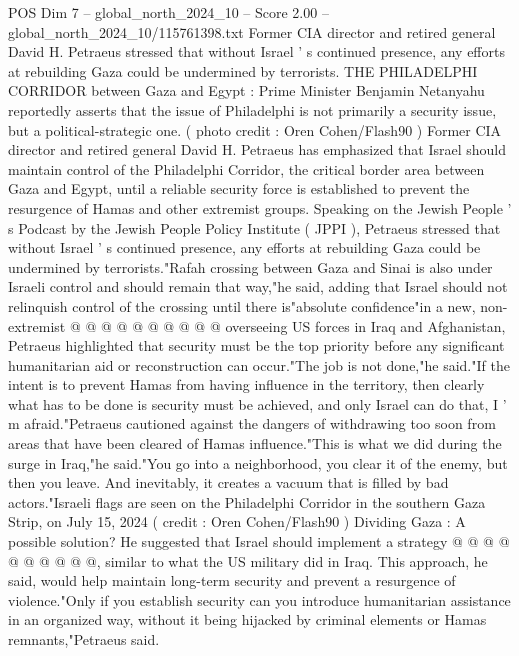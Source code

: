 \begin{textsample}{POS Dim 7 – global\_north\_2024\_10 – Score 2.00 – global\_north\_2024\_10/115761398.txt}  \label{ex:f7_pos_410}
Former CIA director and retired general David H.
Petraeus stressed that without Israel ' s continued presence, any efforts at rebuilding Gaza could be undermined by terrorists.
THE PHILADELPHI CORRIDOR between Gaza and Egypt : Prime Minister Benjamin Netanyahu reportedly asserts that the issue of Philadelphi is not primarily a security issue, but a political-strategic one. ( photo credit : Oren Cohen/Flash90 ) Former CIA director and retired general David H.
Petraeus has emphasized that Israel should maintain control of the Philadelphi Corridor, the critical border area between Gaza and Egypt, until a reliable security force is established to prevent the resurgence of Hamas and other extremist groups.
Speaking on the Jewish People ' s Podcast by the Jewish People Policy Institute ( JPPI ), Petraeus stressed that without Israel ' s continued presence, any efforts at rebuilding Gaza could be undermined by terrorists."Rafah crossing between Gaza and Sinai is also under Israeli control and should remain that way,"he said, adding that Israel should not relinquish control of the crossing until there is"absolute confidence"in a new, non-extremist @ @ @ @ @ @ @ @ @ @ overseeing US forces in Iraq and Afghanistan, Petraeus highlighted that security must be the top priority before any significant humanitarian aid or reconstruction can occur."The job is not done,"he said."If the intent is to prevent Hamas from having influence in the territory, then clearly what has to be done is security must be achieved, and only Israel can do that, I ' m afraid."Petraeus cautioned against the dangers of withdrawing too soon from areas that have been cleared of Hamas influence."This is what we did during the surge in Iraq,"he said."You go into a neighborhood, you clear it of the enemy, but then you leave.
And inevitably, it creates a vacuum that is filled by bad actors."Israeli flags are seen on the Philadelphi Corridor in the southern Gaza Strip, on July 15, 2024 ( credit : Oren Cohen/Flash90 ) Dividing Gaza : A possible solution?
He suggested that Israel should implement a strategy @ @ @ @ @ @ @ @ @ @, similar to what the US military did in Iraq.
This approach, he said, would help maintain long-term security and prevent a resurgence of violence."Only if you establish security can you introduce humanitarian assistance in an organized way, without it being hijacked by criminal elements or Hamas remnants,"Petraeus said.

\end{textsample}
